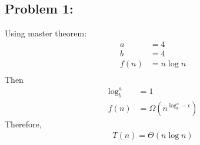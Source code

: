 \documentclass{article}
\begin{document}
 

\hypertarget{}{}
\subsection*{{Problem 1: }}
\label{}
Using master theorem: \\
\begin{align*} 
a &=4 \\ 
b &= 4 \\ 
f(n) &= n\log{n} \\
\end{align*} 
Then \begin{align*} 
\log_b^a & = 1\\
f(n) &= \Omega(n^{\log_b^a-\epsilon})  
\end{align*} 
Therefore, \begin{align*} T(n) = \Theta(n\log{n}) \end{align*} 
\end{document}
